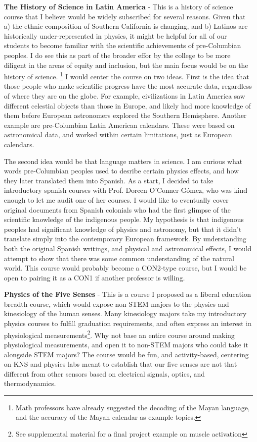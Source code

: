 \documentclass[../../main.tex]{subfiles}
\begin{document}
\textbf{The History of Science in Latin America} - This is a history of science course that I believe would be widely subscribed for several reasons.  Given that a) the ethnic composition of Southern California is changing, and b) Latinos are historically under-represented in physics, it might be helpful for all of our students to become familiar with the scientific achievements of pre-Columbian peoples.  I do see this as part of the broader effor by the college to be more diligent in the areas of equity and inclusion, but the main focus would be on the history of science.  \footnote{Math professors have already suggested the decoding of the Mayan language, and the accuracy of the Mayan calendar as example topics.}  I would center the course on two ideas. First is the idea that those people who make scientific progress have the most accurate data, regardless of where they are on the globe.  For example, civilizations in Latin America saw different celestial objects than those in Europe, and likely had more knowledge of them before European astronomers explored the Southern Hemisphere.  Another example are pre-Columbian Latin American calendars.  These were based on astronomical data, and worked within certain limitations, just as European calendars.  \\ \hspace{0.1cm}

The second idea would be that language matters in science.  I am curious what words pre-Columbian peoples used to desribe certain physics effects, and how they later translated them into Spanish.  As a start, I decided to take introductory spanish courses with Prof. Doreen O'Conner-G\'{o}mez, who was kind enough to let me audit one of her courses.  I would like to eventually cover original documents from Spanish colonials who had the first glimpse of the scientific knowledge of the indigenous people.  My hypothesis is that indigenous peoples had significant knowledge of physics and astronomy, but that it didn't translate simply into the contemporary European framework.  By understanding both the original Spanish writings, and physical and astronomical effects, I would attempt to show that there was some common understanding of the natural world. This course would probably become a CON2-type course, but I would be open to pairing it as a CON1 if another professor is willing. \\ \hspace{0.1cm}

\textbf{Physics of the Five Senses} - This is a course I proposed as a liberal education breadth course, which would expose non-STEM majors to the physics and kinesiology of the human senses.  Many kinesiology majors take my introductory physics courses to fulfill graduation requirements, and often express an interest in physiological measurements\footnote{See supplemental material for a final project example on muscle activation}.  Why not base an entire course around making physiological measurements, and open it to non-STEM majors who could take it alongside STEM majors?  The course would be fun, and activity-based, centering on KNS and physics labs meant to establish that our five senses are not that different from other sensors based on electrical signals, optics, and thermodynamics.
\end{document}
